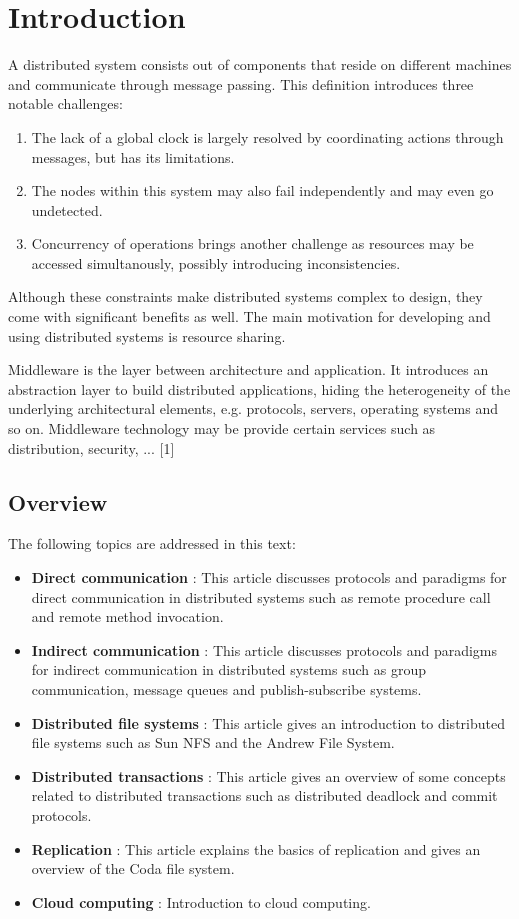 \chapter{Introduction}

A distributed system consists out of components that reside on different machines and communicate through message passing. This definition introduces three notable challenges:

\begin{enumerate}
	\item The lack of a global clock is largely resolved by coordinating actions through messages, but has its limitations.
	\item The nodes within this system may also fail independently and may even go undetected.
	\item Concurrency of operations brings another challenge as resources may be accessed simultanously, possibly introducing inconsistencies.
\end{enumerate}

Although these constraints make distributed systems complex to design, they come with significant benefits as well. The main motivation for developing and using distributed systems is resource sharing.

Middleware is the layer between architecture and application. It introduces an abstraction layer to build distributed applications, hiding the heterogeneity of the underlying architectural elements, e.g. protocols, servers, operating systems and so on. Middleware technology may be provide certain services such as distribution, security, ... [1]

\section*{Overview}

The following topics are addressed in this text:

\begin{itemize}
	\item \textbf{Direct communication} : This article discusses protocols and paradigms for direct communication in distributed systems such as remote procedure call and remote method invocation.
	\item \textbf{Indirect communication} : This article discusses protocols and paradigms for indirect communication in distributed systems such as group communication, message queues and publish-subscribe systems.
	\item \textbf{Distributed file systems} : This article gives an introduction to distributed file systems such as Sun NFS and the Andrew File System.
	\item \textbf{Distributed transactions} : This article gives an overview of some concepts related to distributed transactions such as distributed deadlock and commit protocols.
	\item \textbf{Replication} : This article explains the basics of replication and gives an overview of the Coda file system.
	\item \textbf{Cloud computing} : Introduction to cloud computing.
\end{itemize}


